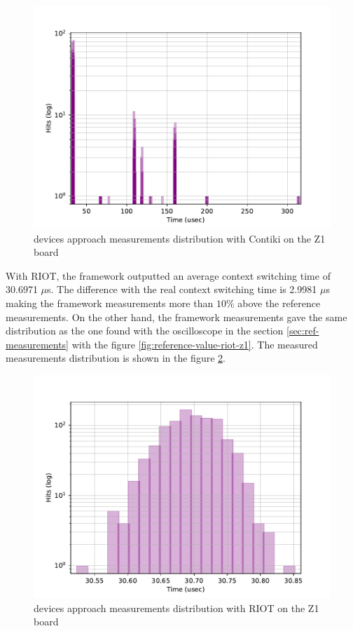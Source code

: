\begin{figure}[!ht]
      \centering
      \includegraphics[scale=.7]{assets/devices-framework-contiki-z1.pdf}
      \caption{devices approach measurements distribution with Contiki on the Z1 board\label{fig:devices-framework-contiki-z1}}
\end{figure}

With RIOT, the framework outputted an average context switching time of 30.6971 $\mu$s.
The difference with the real context switching time is 2.9981 $\mu$s making the framework measurements more than $10\%$ above the reference measurements.
On the other hand, the framework measurements gave the same distribution as the one found with the oscilloscope in the section \ref{sec:ref-measurements} with the figure \ref{fig:reference-value-riot-z1}.
The measured measurements distribution is shown in the figure \ref{fig:devices-framework-riot-z1}.

\begin{figure}[!ht]
      \centering
      \includegraphics[scale=.7]{assets/devices-framework-riot-z1.pdf}
      \caption{devices approach measurements distribution with RIOT on the Z1 board\label{fig:devices-framework-riot-z1}}
\end{figure}

